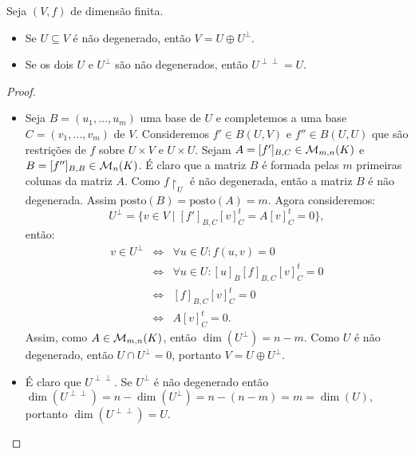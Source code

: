\documentclass[11pt,twoside,a4paper]{book}
\begin{document}
\begin{proposicao}
Seja $(V,f)$ de dimensão finita.
\begin{itemize}
\item Se $U\subseteq V$ é não degenerado, então $V=U\oplus U^\perp$.
\item Se os dois $U$ e $U^\perp$ são não degenerados, então $U^{\perp\perp}=U$.
\end{itemize}
\end{proposicao}
\begin{proof}
\begin{itemize}
\item Seja $B=(u_1,\dots,u_m)$ uma base de $U$ e completemos a uma base $C=(v_1,\dots,v_m)$ de $V$. Consideremos $f'\in B(U,V)$ e $f''\in B(U,U)$ que são restrições de $f$ sobre $U\times V$ e $U\times U$. Sejam $A=[f']_{B,C}\in\mathcal{M}_{m,n}(K)$ e $B=[f'']_{B,B}\in\mathcal{M}_{n}(K)$. É claro que a matriz $B$ é formada pelas $m$ primeiras colunas da matriz $A$. Como $f\upharpoonright_U$ é não degenerada, então a matriz $B$ é não degenerada. Assim $\mathrm{posto}(B)=\mathrm{posto}(A)=m$. Agora consideremos:
\[
U^\perp=\{v\in V\mid[f']_{B,C}[v]^t_C=A[v]^t_C=0\},
\]
então:
\[
\begin{array}{rcl}
v\in U^\perp&\Leftrightarrow&\forall u\in U:f(u,v)=0\\
&\Leftrightarrow&\forall u\in U:[u]_B[f]_{B,C}[v]^t_C=0\\
&\Leftrightarrow&[f]_{B,C}[v]^t_C=0\\
&\Leftrightarrow&A[v]^t_C=0.
\end{array}
\]
Assim, como $A\in\mathcal{M}_{m,n}(K)$, então $\dim(U^\perp)=n-m.$ Como $U$ é não degenerado, então $U\cap U^\perp=0$, portanto $V=U\oplus U^\perp.$
\item É claro que $U^{\perp\perp}.$ Se $U^\perp$ é não degenerado então $\dim(U^{\perp\perp})=n-\dim(U^\perp)=n-(n-m)=m=\dim(U),$ portanto $\dim(U^{\perp\perp})=U$.
\end{itemize}
\end{proof}
\end{document}
